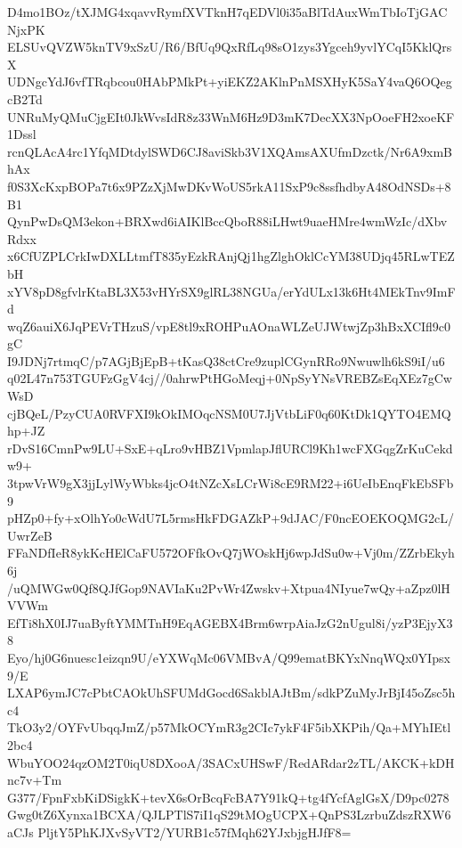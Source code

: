 D4mo1BOz/tXJMG4xqavvRymfXVTknH7qEDVl0i35aBlTdAuxWmTbIoTjGACNjxPK
ELSUvQVZW5knTV9xSzU/R6/BfUq9QxRfLq98sO1zys3Ygceh9yvlYCqI5KklQrsX
UDNgcYdJ6vfTRqbcou0HAbPMkPt+yiEKZ2AKlnPnMSXHyK5SaY4vaQ6OQegcB2Td
UNRuMyQMuCjgEIt0JkWvsIdR8z33WnM6Hz9D3mK7DecXX3NpOoeFH2xoeKF1Dssl
rcnQLAcA4rc1YfqMDtdylSWD6CJ8aviSkb3V1XQAmsAXUfmDzctk/Nr6A9xmBhAx
f0S3XcKxpBOPa7t6x9PZzXjMwDKvWoUS5rkA11SxP9c8ssfhdbyA48OdNSDs+8B1
QynPwDsQM3ekon+BRXwd6iAIKlBccQboR88iLHwt9uaeHMre4wmWzIc/dXbvRdxx
x6CfUZPLCrkIwDXLLtmfT835yEzkRAnjQj1hgZlghOklCcYM38UDjq45RLwTEZbH
xYV8pD8gfvlrKtaBL3X53vHYrSX9glRL38NGUa/erYdULx13k6Ht4MEkTnv9ImFd
wqZ6auiX6JqPEVrTHzuS/vpE8tl9xROHPuAOnaWLZeUJWtwjZp3hBxXCIfl9c0gC
I9JDNj7rtmqC/p7AGjBjEpB+tKasQ38ctCre9zuplCGynRRo9Nwuwlh6kS9iI/u6
q02L47n753TGUFzGgV4cj//0ahrwPtHGoMeqj+0NpSyYNsVREBZsEqXEz7gCwWsD
cjBQeL/PzyCUA0RVFXI9kOkIMOqcNSM0U7JjVtbLiF0q60KtDk1QYTO4EMQhp+JZ
rDvS16CmnPw9LU+SxE+qLro9vHBZ1VpmlapJflURCl9Kh1wcFXGqgZrKuCekdw9+
3tpwVrW9gX3jjLylWyWbks4jcO4tNZcXsLCrWi8cE9RM22+i6UeIbEnqFkEbSFb9
pHZp0+fy+xOlhYo0cWdU7L5rmsHkFDGAZkP+9dJAC/F0ncEOEKOQMG2cL/UwrZeB
FFaNDfIeR8ykKcHElCaFU572OFfkOvQ7jWOskHj6wpJdSu0w+Vj0m/ZZrbEkyh6j
/uQMWGw0Qf8QJfGop9NAVIaKu2PvWr4Zwskv+Xtpua4NIyue7wQy+aZpz0lHVVWm
EfTi8hX0IJ7uaByftYMMTnH9EqAGEBX4Brm6wrpAiaJzG2nUgul8i/yzP3EjyX38
Eyo/hj0G6nuesc1eizqn9U/eYXWqMc06VMBvA/Q99ematBKYxNnqWQx0YIpsx9/E
LXAP6ymJC7cPbtCAOkUhSFUMdGocd6SakblAJtBm/sdkPZuMyJrBjI45oZsc5hc4
TkO3y2/OYFvUbqqJmZ/p57MkOCYmR3g2CIc7ykF4F5ibXKPih/Qa+MYhIEtl2bc4
WbuYOO24qzOM2T0iqU8DXooA/3SACxUHSwF/RedARdar2zTL/AKCK+kDHnc7v+Tm
G377/FpnFxbKiDSigkK+tevX6sOrBcqFcBA7Y91kQ+tg4fYcfAglGsX/D9pc0278
Gwg0tZ6Xynxa1BCXA/QJLPTlS7iI1qS29tMOgUCPX+QnPS3LzrbuZdszRXW6aCJs
PljtY5PhKJXvSyVT2/YURB1c57fMqh62YJxbjgHJfF8=
